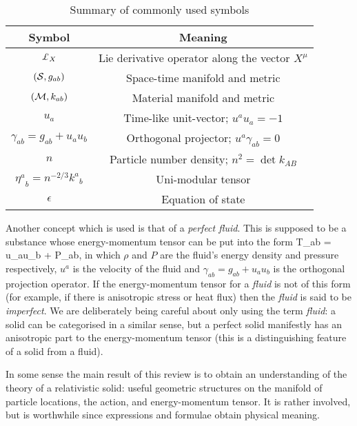 {\renewcommand{\arraystretch}{1.4}
\begin{table}%
\begin{center}
\begin{tabular}{||c |  c ||}
\hline
\textbf{Symbol} & \textbf{Meaning} \\
\hline
$\lied{X}$ & Lie derivative operator along the vector $X^{\mu}$\\\hline
$\left(\mathcal{S}, g_{ab}\right)$ & Space-time manifold and metric\\\hline
$\left(\mathcal{M}, k_{ab}\right)$ & Material manifold and metric \\\hline
$u_a$ & Time-like unit-vector; $u^au_a = -1$\\\hline
$\gamma_{ab} = g_{ab} + u_au_b$ & Orthogonal projector; $u^a\gamma_{ab}=0$\\\hline
$n$ & Particle number density; $n^2 = \det k_{AB} $\\\hline
${\eta^a}_b = n^{-2/3}{k^a}_b$ & Uni-modular tensor\\\hline
$\epsilon$ & Equation of state
\\\hline
\end{tabular}\caption{Summary of commonly used symbols}\label{tab:common}
\end{center}
\end{table}
}

Another  concept which is used is that of a \textit{perfect fluid}. This is supposed to be a substance whose energy-momentum tensor can be put into the form
\bea
T_{ab} = \rho u_au_b + P\gamma_{ab},
\eea
in which $\rho$ and $P$ are the  fluid's energy density and pressure respectively, $u^a$ is the velocity of the fluid and $\gamma_{ab} = g_{ab} + u_au_b$ is the orthogonal projection operator. If the energy-momentum tensor for a \textit{fluid} is not of this form (for example, if there is anisotropic stress or heat flux) then the \textit{fluid} is said to be   \textit{imperfect}. We are deliberately being careful about only using the term \textit{fluid}: a solid can be categorised in a similar sense, but a perfect solid manifestly has an anisotropic part to the energy-momentum tensor (this is a distinguishing feature of a solid from a fluid).


In some sense the main result of this review is to obtain an understanding of the theory of a relativistic solid: useful geometric structures on the manifold of particle locations, the action, and energy-momentum tensor. It is rather involved, but is worthwhile since expressions and formulae obtain physical meaning.

